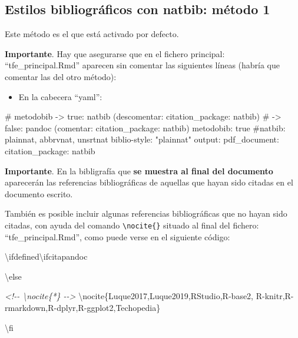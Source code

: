 \documentclass[12pt,a4paper,oneside,]{book}
\newenvironment{Shaded}{\begin{snugshade}}{\end{snugshade}}
\newcommand{\CommentTok}[1]{\textcolor[rgb]{0.56,0.35,0.01}{\textit{#1}}}
\newcommand{\FunctionTok}[1]{\textcolor[rgb]{0.00,0.00,0.00}{#1}}
\newcommand{\NormalTok}[1]{#1}
\providecommand{\tightlist}{%
  \setlength{\itemsep}{0pt}\setlength{\parskip}{0pt}}
\numberwithin{dummy}{section}
\theoremstyle{ocrenumbox}
\theoremstyle{blacknumex}
\theoremstyle{blacknumbox}
\theoremstyle{ocrenum}
\theoremstyle{ocrenum}
\begin{document}
\hypertarget{estilos-bibliogruxe1ficos-con-natbib-muxe9todo-1}{%
\subsection{Estilos bibliográficos con natbib: método
1}\label{estilos-bibliogruxe1ficos-con-natbib-muxe9todo-1}}

Este método es el que está activado por defecto.

\textbf{Importante}. Hay que asegurarse que en el fichero principal:
``tfe\_principal.Rmd'' aparecen sin comentar las siguientes líneas
(habría que comentar las del otro método):

\begin{itemize}
\tightlist
\item
  En la cabecera ``yaml'':
\end{itemize}

\footnotesize

\begin{Shaded}
\begin{Highlighting}[]
\FunctionTok{\# metodobib {-}\textgreater{} true: natbib (descomentar: citation\_package: natbib) }
\FunctionTok{\#           {-}\textgreater{} false: pandoc (comentar: citation\_package: natbib)}
\NormalTok{metodobib: true}
\NormalTok{\#natbib: plainnat, abbrvnat, unsrtnat}
\NormalTok{biblio{-}style: "plainnat"}
\NormalTok{output: }
\NormalTok{  pdf\_document: }
\NormalTok{    citation\_package: natbib}
\end{Highlighting}
\end{Shaded}

\normalsize

\textbf{Importante}. En la bibligrafía que \textbf{se muestra al final
del documento} aparecerán las referencias bibliográficas de aquellas que
hayan sido citadas en el documento escrito.

También es posible incluir algunas referencias bibliográficas que no
hayan sido citadas, con ayuda del comando
\texttt{\textbackslash{}nocite\{\}} situado al final del fichero:
``tfe\_principal.Rmd'', como puede verse en el siguiente código:

\footnotesize

\begin{Shaded}
\begin{Highlighting}[]
\NormalTok{\textbackslash{}ifdefined\textbackslash{}ifcitapandoc}

\NormalTok{\textbackslash{}else}

\CommentTok{\textless{}!{-}{-} \textbackslash{}nocite\{*\} {-}{-}\textgreater{}}
\NormalTok{\textbackslash{}nocite\{Luque2017,Luque2019,RStudio,R{-}base2,}
\NormalTok{R{-}knitr,R{-}rmarkdown,R{-}dplyr,R{-}ggplot2,Techopedia\}}

\NormalTok{\textbackslash{}fi }
\end{Highlighting}
\end{Shaded}
\end{document}
